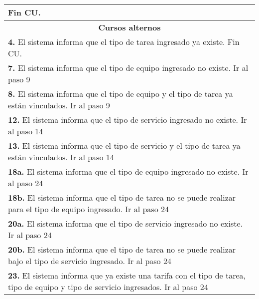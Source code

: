 \documentclass[12pt]{extarticle}
\begin{document}
\begin{longtable}{ |p{8cm}|p{8cm}| }
			\inc Fin CU. & \\
		\hline
		\multicolumn{2}{|c|}{\textbf{Cursos alternos}}\\
		\hline
		\multicolumn{2}{|p{16cm}|}{\textbf{4. }El sistema informa que el tipo de tarea ingresado ya existe. Fin CU.}\\
		\hline
		\multicolumn{2}{|p{16cm}|}{\textbf{7. }El sistema informa que el tipo de equipo ingresado no existe. Ir al paso 9}\\
		\hline	
		\multicolumn{2}{|p{16cm}|}{\textbf{8. }El sistema informa que el tipo de equipo y el tipo de tarea ya están vinculados. Ir al paso 9}\\
		\hline	
		\multicolumn{2}{|p{16cm}|}{\textbf{12. }El sistema informa que el tipo de servicio ingresado no existe. Ir al paso 14}\\
		\hline	
		\multicolumn{2}{|p{16cm}|}{\textbf{13. }El sistema informa que el tipo de servicio y el tipo de tarea ya están vinculados. Ir al paso 14}\\
		\hline	
		\multicolumn{2}{|p{16cm}|}{\textbf{18a. }El sistema informa que el tipo de equipo ingresado no existe. Ir al paso 24}\\
		\hline	
		\multicolumn{2}{|p{16cm}|}{\textbf{18b. }El sistema informa que el tipo de tarea no se puede realizar para el tipo de equipo ingresado. Ir al paso 24}\\
		\hline	
		\multicolumn{2}{|p{16cm}|}{\textbf{20a. }El sistema informa que el tipo de servicio ingresado no existe. Ir al paso 24}\\
		\hline	
		\multicolumn{2}{|p{16cm}|}{\textbf{20b. }El sistema informa que el tipo de tarea no se puede realizar bajo el tipo de servicio ingresado. Ir al paso 24}\\
		\hline	
		\multicolumn{2}{|p{16cm}|}{\textbf{23. }El sistema informa que ya existe una tarifa con el tipo de tarea, tipo de equipo y tipo de servicio ingresados. Ir al paso 24}\\
		\hline	
	\end{longtable}

    \resetinc{}
    \raya{}
\end{document}
